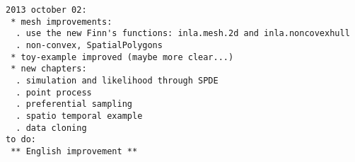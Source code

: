 \begin{verbatim}
2013 october 02:
 * mesh improvements:
  . use the new Finn's functions: inla.mesh.2d and inla.noncovexhull 
  . non-convex, SpatialPolygons 
 * toy-example improved (maybe more clear...) 
 * new chapters: 
  . simulation and likelihood through SPDE
  . point process 
  . preferential sampling 
  . spatio temporal example 
  . data cloning
to do: 
 ** English improvement ** 

\end{verbatim}
